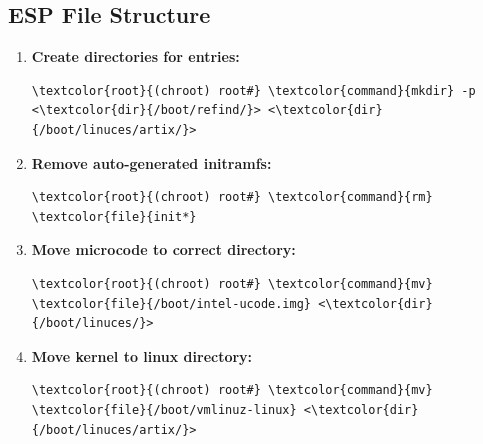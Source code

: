 \documentclass[10pt, a4paper, onecolumn, oneside, titlepage, openany]{book}
\begin{document}
\subsection{ESP File Structure}
\begin{enumerate}
    \item \textbf{Create directories for entries:}
\begin{Verbatim}[commandchars=\\\{\}]
\textcolor{root}{(chroot) root#} \textcolor{command}{mkdir} -p <\textcolor{dir}{/boot/refind/}> <\textcolor{dir}{/boot/linuces/artix/}>
\end{Verbatim}
    \item \textbf{Remove auto-generated initramfs:}
\begin{Verbatim}[commandchars=\\\{\}]
\textcolor{root}{(chroot) root#} \textcolor{command}{rm} \textcolor{file}{init*}
\end{Verbatim}
    \item \textbf{Move microcode to correct directory:}
\begin{Verbatim}[commandchars=\\\{\}]
\textcolor{root}{(chroot) root#} \textcolor{command}{mv} \textcolor{file}{/boot/intel-ucode.img} <\textcolor{dir}{/boot/linuces/}>
\end{Verbatim}
    \item \textbf{Move kernel to linux directory:}
\begin{Verbatim}[commandchars=\\\{\}]
\textcolor{root}{(chroot) root#} \textcolor{command}{mv} \textcolor{file}{/boot/vmlinuz-linux} <\textcolor{dir}{/boot/linuces/artix/}>
\end{Verbatim}
\end{enumerate}
\end{document}
